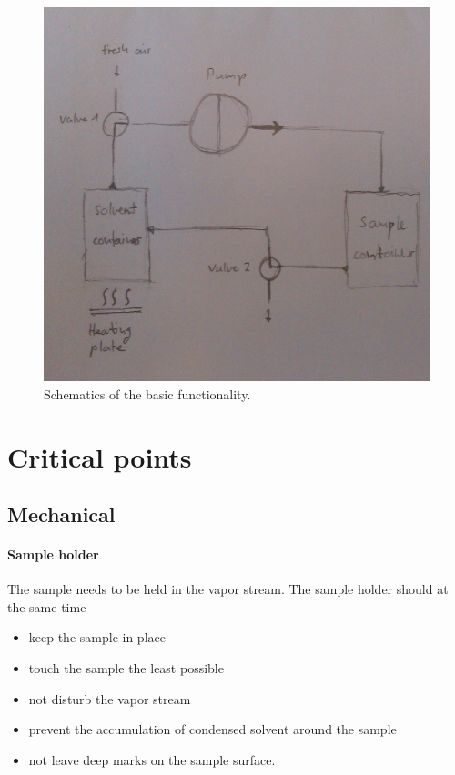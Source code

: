 \documentclass[a4paper, 12pt]{paper}
\begin{document}
\begin{figure}[h]
    \centering
    \includegraphics[width=0.9\linewidth]{schematics.jpg}
    \caption{Schematics of the basic functionality.}
\label{fig:schmeatics}
\end{figure}

\section{Critical points}

\subsection{Mechanical}
\paragraph{Sample holder}
The sample needs to be held in the vapor stream. The sample holder should at
the same time
\begin{itemize}
    \item keep the sample in place
    \item touch the sample the least possible
    \item not disturb the vapor stream
    \item prevent the accumulation of condensed solvent around the sample
    \item not leave deep marks on the sample surface.
\end{itemize}
\end{document}
